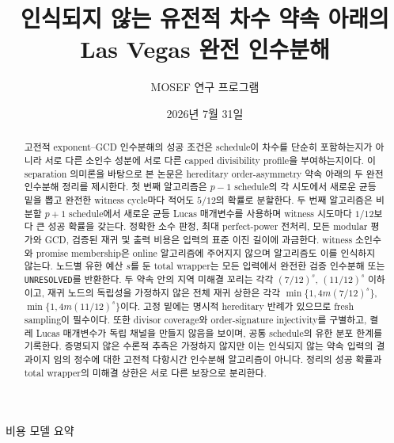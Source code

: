 \documentclass[11pt]{article}
\title{인식되지 않는 유전적 차수 약속 아래의\\
Las Vegas 완전 인수분해}
\author{MOSEF 연구 프로그램}
\date{2026년 7월 31일}
\begin{document}
\maketitle

\begin{abstract}
고전적 exponent--GCD 인수분해의 성공 조건은 schedule이 차수를 단순히
포함하는지가 아니라 서로 다른 소인수 성분에 서로 다른 capped
divisibility profile을 부여하는지이다. 이 separation 의미론을 바탕으로
본 논문은 hereditary order-asymmetry 약속 아래의 두 완전 인수분해
정리를 제시한다. 첫 번째 알고리즘은 \(p-1\) schedule의 각 시도에서
새로운 균등 밑을 뽑고 완전한 witness cycle마다 적어도 \(5/12\)의
확률로 분할한다. 두 번째 알고리즘은 비분할 \(p+1\) schedule에서
새로운 균등 Lucas 매개변수를 사용하며 witness 시도마다 \(1/12\)보다
큰 성공 확률을 갖는다. 정확한 소수 판정, 최대 perfect-power 전처리,
모든 modular 평가와 GCD, 검증된 재귀 및 출력 비용은 입력의 표준 이진
길이에 과금한다. witness 소인수와 promise membership은 online
알고리즘에 주어지지 않으며 알고리즘도 이를 인식하지 않는다. 노드별
유한 예산 \(s\)를 둔 total wrapper는 모든 입력에서 완전한 검증
인수분해 또는 \texttt{UNRESOLVED}를 반환한다. 두 약속 안의 지역
미해결 꼬리는 각각 \((7/12)^s\), \((11/12)^s\) 이하이고, 재귀 노드의
독립성을 가정하지 않은 전체 재귀 상한은 각각
\(\min\{1,4m(7/12)^s\}\), \(\min\{1,4m(11/12)^s\}\)이다. 고정 밑에는
명시적 hereditary 반례가 있으므로 fresh sampling이 필수이다. 또한
divisor coverage와 order-signature injectivity를 구별하고, 켤레 Lucas
매개변수가 독립 채널을 만들지 않음을 보이며, 공통 schedule의 유한
분포 한계를 기록한다. 증명되지 않은 수론적 추측은 가정하지 않지만
이는 인식되지 않는 약속 입력의 결과이지 임의 정수에 대한 고전적
다항시간 인수분해 알고리즘이 아니다. 정리의 성공 확률과 total
wrapper의 미해결 상한은 서로 다른 보장으로 분리한다.
\end{abstract}

\begin{costmodel}{비용 모델 요약}
\end{costmodel}
\end{document}
